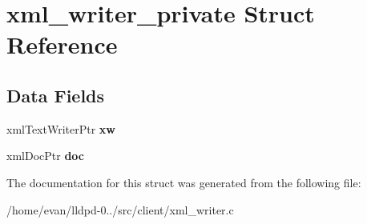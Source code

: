 \section{xml\-\_\-writer\-\_\-private \-Struct \-Reference}
\label{structxml__writer__private}
\subsection*{\-Data \-Fields}
\begin{DoxyCompactItemize}
\item 
xml\-Text\-Writer\-Ptr {\bfseries xw}\label{structxml__writer__private_a438cfd8c9e9d9b9f3a2cb1f83dff1e26}

\item 
xml\-Doc\-Ptr {\bfseries doc}\label{structxml__writer__private_acb7e0779c02127031b073502aca38a8c}

\end{DoxyCompactItemize}


\-The documentation for this struct was generated from the following file\-:\begin{DoxyCompactItemize}
\item 
/home/evan/lldpd-\/0../src/client/xml\-\_\-writer.\-c\end{DoxyCompactItemize}
